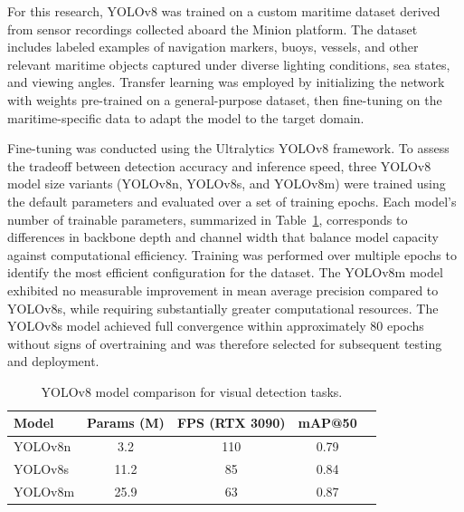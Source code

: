 \documentclass{erauthesis}
\begin{document}
For this research, YOLOv8 was trained on a custom maritime dataset derived from sensor recordings collected aboard the Minion platform.
The dataset includes labeled examples of navigation markers, buoys, vessels, and other relevant maritime objects captured under diverse lighting conditions, sea states, and viewing angles.
Transfer learning was employed by initializing the network with weights pre-trained on a general-purpose dataset, then fine-tuning on the maritime-specific data to adapt the model to the target domain.

Fine-tuning was conducted using the Ultralytics YOLOv8 framework. \cite{ultralytics} %
To assess the tradeoff between detection accuracy and inference speed, three YOLOv8 model size variants (YOLOv8n, YOLOv8s, and YOLOv8m) were trained using the default parameters and evaluated over a set of training epochs.
Each model’s number of trainable parameters, summarized in Table~\ref{tab:yolo_variants}, corresponds to differences in backbone depth and channel width that balance model capacity against computational efficiency.
Training was performed over multiple epochs to identify the most efficient configuration for the dataset.
The YOLOv8m model exhibited no measurable improvement in mean average precision compared to YOLOv8s, while requiring substantially greater computational resources.
The YOLOv8s model achieved full convergence within approximately 80 epochs without signs of overtraining and was therefore selected for subsequent testing and deployment.

\begin{table}[htbp]
\centering
\begin{tabular}{l c c c c}
\hline
Model & Params (M) & FPS (RTX 3090) & mAP@50 \\
\hline
YOLOv8n & 3.2 &  110 & 0.79 \\
YOLOv8s & 11.2 &  85 & 0.84 \\
YOLOv8m & 25.9 &  63 & 0.87 \\
\hline
\end{tabular}
\caption{YOLOv8 model comparison for visual detection tasks.}
\label{tab:yolo_variants}
\end{table}
\end{document}
